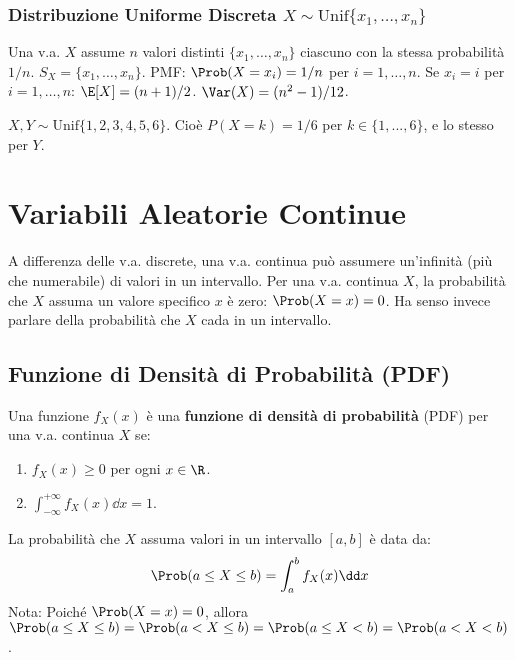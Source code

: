 \subsection{Distribuzione Uniforme Discreta \texorpdfstring{$X \sim \text{Unif}\{x_1, \dots, x_n\}$}{X ~ Unif}}
Una v.a. $X$ assume $n$ valori distinti $\{x_1, \dots, x_n\}$ ciascuno con la stessa probabilità $1/n$.
$S_X = \{x_1, \dots, x_n\}$.
PMF: $\Prob(X=x_i) = 1/n$ per $i=1, \dots, n$.
Se $x_i = i$ per $i=1, \dots, n$:
$\E[X] = (n+1)/2$.
$\Var(X) = (n^2-1)/12$.
\begin{example}
$X, Y \sim \text{Unif}\{1, 2, 3, 4, 5, 6\}$. Cioè $P(X=k)=1/6$ per $k \in \{1, ..., 6\}$, e lo stesso per $Y$.
\end{example}

\chapter{Variabili Aleatorie Continue}
\label{cap:va_continue}
A differenza delle v.a. discrete, una v.a. continua può assumere un'infinità (più che numerabile) di valori in un intervallo. Per una v.a. continua $X$, la probabilità che $X$ assuma un valore specifico $x$ è zero: $\Prob(X=x)=0$. Ha senso invece parlare della probabilità che $X$ cada in un intervallo.

\section{Funzione di Densità di Probabilità (PDF)}
\begin{definition}
Una funzione $f_X(x)$ è una \textbf{funzione di densità di probabilità} (PDF) per una v.a. continua $X$ se:
\begin{enumerate}
    \item $f_X(x) \ge 0$ per ogni $x \in \R$.
    \item $\int_{-\infty}^{+\infty} f_X(x) \dd x = 1$.
\end{enumerate}
La probabilità che $X$ assuma valori in un intervallo $[a,b]$ è data da:
\[ \Prob(a \le X \le b) = \int_a^b f_X(x) \dd x \]
Nota: Poiché $\Prob(X=x)=0$, allora $\Prob(a \le X \le b) = \Prob(a < X \le b) = \Prob(a \le X < b) = \Prob(a < X < b)$.
\end{definition}

